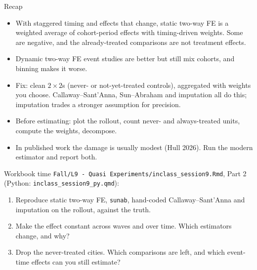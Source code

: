 \documentclass[aspectratio=169,11pt]{beamer}
\begin{document}
\begin{frame}{Recap}
\begin{itemize}
	\item With staggered timing and effects that change, static two-way FE is a weighted average of cohort-period effects
	with timing-driven weights. Some are negative, and the already-treated comparisons are not treatment effects.
	\medskip
	\item Dynamic two-way FE event studies are better but still mix cohorts, and binning makes it worse.
	\medskip
	\item Fix: clean $2\times2$s (never- or not-yet-treated controls), aggregated with weights you choose. Callaway--Sant'Anna,
	Sun--Abraham and imputation all do this; imputation trades a stronger assumption for precision.
	\medskip
	\item Before estimating: plot the rollout, count never- and always-treated units, compute the weights, decompose.
	\medskip
	\item In published work the damage is usually modest (Hull 2026). Run the modern estimator and report both.
\end{itemize}
\end{frame}


\begin{frame}{Workbook time}
\texttt{Fall/L9 - Quasi Experiments/inclass\_session9.Rmd}, Part 2 (Python: \texttt{inclass\_session9\_py.qmd}):
\begin{enumerate}
	\item Reproduce static two-way FE, \texttt{sunab}, hand-coded Callaway--Sant'Anna and imputation on the rollout, against the truth.
	\item Make the effect constant across waves and over time. Which estimators change, and why?
	\item Drop the never-treated cities. Which comparisons are left, and which event-time effects can you still estimate?
\end{enumerate}
\end{frame}
\end{document}
